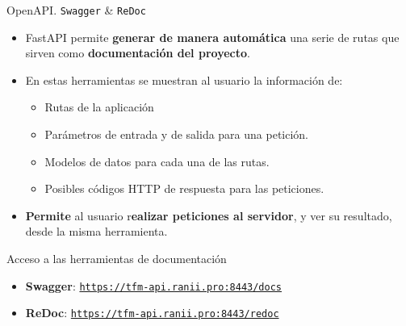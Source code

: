\documentclass[aspectratio=169,xcolor=dvipsnames]{beamer}
\begin{document}
	\begin{frame}{OpenAPI. \texttt{Swagger} \& \texttt{ReDoc}}
		\begin{itemize}
			\item FastAPI permite \textbf{generar de manera automática} una serie de rutas que sirven como \textbf{documentación del proyecto}.
			
			\item En estas herramientas se muestran al usuario la información de: 
			
			\begin{itemize}
				\item Rutas de la aplicación
				
				\item Parámetros de entrada y de salida para una petición.
				
				\item Modelos de datos para cada una de las rutas.
				
				\item Posibles códigos HTTP de respuesta para las peticiones.
			\end{itemize}
		
			\item \textbf{Permite} al usuario r\textbf{ealizar peticiones al servidor}, y ver su resultado, desde la misma herramienta.
		\end{itemize}
		
		\begin{block}{Acceso a las herramientas de documentación}
			\begin{itemize}
				\item \textbf{Swagger}: \href{https://tfm-api.ranii.pro:8443/docs}{\texttt{https://tfm-api.ranii.pro:8443/docs}}
				
				\item \textbf{ReDoc}: \href{https://tfm-api.ranii.pro:8443/redoc}{\texttt{https://tfm-api.ranii.pro:8443/redoc}}
			\end{itemize}
		\end{block}
	\end{frame}
	
	
\end{document}
